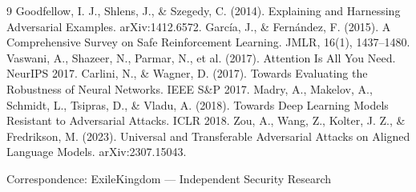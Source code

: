 \documentclass[11pt,letterpaper]{article}
\begin{document}
\begin{thebibliography}{9}
 Goodfellow, I. J., Shlens, J., \& Szegedy, C. (2014). Explaining and Harnessing Adversarial Examples. arXiv:1412.6572.
 Garc\'ia, J., \& Fern\'andez, F. (2015). A Comprehensive Survey on Safe Reinforcement Learning. JMLR, 16(1), 1437--1480.
 Vaswani, A., Shazeer, N., Parmar, N., et al. (2017). Attention Is All You Need. NeurIPS 2017.
 Carlini, N., \& Wagner, D. (2017). Towards Evaluating the Robustness of Neural Networks. IEEE S\&P 2017.
 Madry, A., Makelov, A., Schmidt, L., Tsipras, D., \& Vladu, A. (2018). Towards Deep Learning Models Resistant to Adversarial Attacks. ICLR 2018.
 Zou, A., Wang, Z., Kolter, J. Z., \& Fredrikson, M. (2023). Universal and Transferable Adversarial Attacks on Aligned Language Models. arXiv:2307.15043.
\end{thebibliography}

\noindent Correspondence: ExileKingdom --- Independent Security Research
\end{document}

